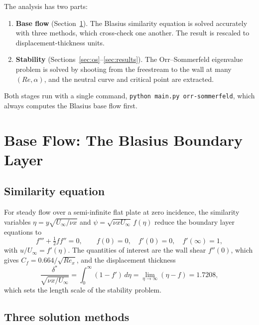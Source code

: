 \documentclass[12pt,a4paper]{article}
\begin{document}
The analysis has two parts:
\begin{enumerate}
    \item \textbf{Base flow} (Section~\ref{sec:blasius}). The Blasius similarity equation is solved accurately with three methods, which cross-check one another. The result is rescaled to displacement-thickness units.
    \item \textbf{Stability} (Sections~\ref{sec:os}--\ref{sec:results}). The Orr--Sommerfeld eigenvalue problem is solved by shooting from the freestream to the wall at many $(Re, \alpha)$, and the neutral curve and critical point are extracted.
\end{enumerate}
Both stages run with a single command, \texttt{python main.py orr-sommerfeld}, which always computes the Blasius base flow first.

\section{Base Flow: The Blasius Boundary Layer}
\label{sec:blasius}

\subsection{Similarity equation}

For steady flow over a semi-infinite flat plate at zero incidence, the similarity variables $\eta = y\sqrt{U_\infty/\nu x}$ and $\psi = \sqrt{\nu x U_\infty}\, f(\eta)$ reduce the boundary layer equations to~\cite{blasius1908}
\begin{equation}
    f''' + \tfrac{1}{2} f f'' = 0, \qquad f(0) = 0,\quad f'(0) = 0,\quad f'(\infty) = 1,
    \label{eq:blasius}
\end{equation}
with $u/U_\infty = f'(\eta)$. The quantities of interest are the wall shear $f''(0)$, which gives $C_f = 0.664/\sqrt{Re_x}$, and the displacement thickness
\begin{equation}
    \frac{\delta^*}{\sqrt{\nu x / U_\infty}} = \int_0^\infty (1 - f')\, d\eta = \lim_{\eta\to\infty}(\eta - f) = 1.7208,
\end{equation}
which sets the length scale of the stability problem.

\subsection{Three solution methods}
\end{document}
